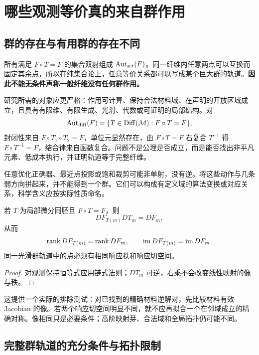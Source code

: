 \section{哪些观测等价真的来自群作用}

\subsection{群的存在与有用群的存在不同}

所有满足 $F\circ T=F$ 的集合双射组成 $\operatorname{Aut}_{\rm set}(F)$。同一纤维内任意两点可以互换而固定其余点，所以在纯集合论上，任意等价关系都可以写成某个巨大群的轨道。\textbf{因此不能无条件声称一般纤维没有任何群作用。}

研究所需的对象应更严格：作用可计算、保持合法材料域、在声明的开放区域成立，且具有有限维、有限生成、光滑、代数或可证明的局部结构。对
\begin{equation}
\operatorname{Aut}_{\rm diff}(F)=\{T\in\operatorname{Diff}(\mathcal M):F\circ T=F\},
\end{equation}
封闭性来自 $F\circ T_1\circ T_2=F$，单位元显然存在，由 $F\circ T=F$ 右复合 $T^{-1}$ 得 $F\circ T^{-1}=F$，结合律来自函数复合。问题不是公理是否成立，而是能否找出非平凡元素、低成本执行，并证明轨道等于完整纤维。

任意优化正确器、最近点投影或饱和裁剪可能非单射，没有逆。将这些动作与几条弱方向拼起来，并不能得到一个群。它们可以构成有定义域的算法变换或对应关系，科学含义应按实际性质命名。

\begin{proposition}[精确光滑对称的必要条件]
若 $T$ 为局部微分同胚且 $F\circ T=F$，则
\begin{equation}
DF_{T(m)}DT_m=DF_m,
\end{equation}
从而
\begin{equation}
\operatorname{rank} DF_{T(m)}=\operatorname{rank} DF_m,\qquad
\operatorname{im} DF_{T(m)}=\operatorname{im} DF_m.
\end{equation}
同一光滑群轨道中的点必须有相同响应秩和响应切空间。
\end{proposition}
\begin{proof}
对观测保持恒等式应用链式法则；$DT_m$ 可逆，右乘不会改变线性映射的像与秩。
\end{proof}

这提供一个实际的排除测试：对已找到的精确材料逆解对，先比较材料有效 Jacobian 的像。若两个响应切空间明显不同，就不应再拟合一个在邻域成立的精确对称。像相同只是必要条件；高阶映射芽、合法域和全局拓扑仍可能不同。

\subsection{完整群轨道的充分条件与拓扑限制}

